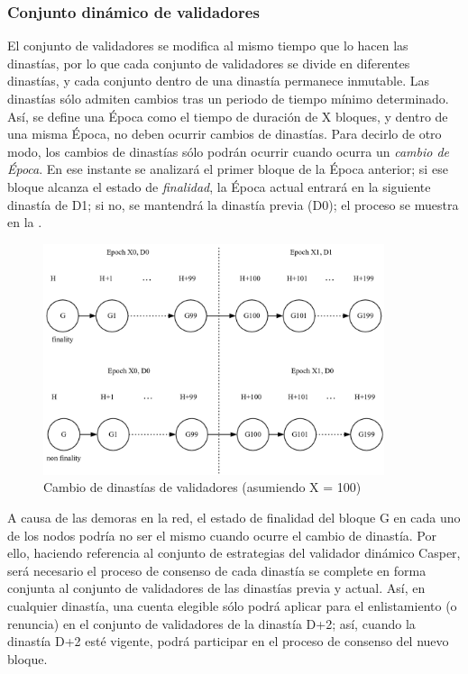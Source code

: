 
\subsubsection{Conjunto dinámico de validadores}
\label{pod:design:validators}

El conjunto de validadores se modifica al mismo tiempo que lo hacen las dinastías, por lo que cada conjunto de validadores se divide en diferentes dinastías, y cada conjunto dentro de una dinastía permanece inmutable. Las dinastías sólo admiten cambios tras un periodo de tiempo mínimo determinado. Así, se define una Época como el tiempo de duración de X bloques, y dentro de una misma Época, no deben ocurrir cambios de dinastías. Para decirlo de otro modo, los cambios de dinastías sólo podrán ocurrir cuando ocurra un \textit{cambio de Época}. En ese instante se analizará el primer bloque de la Época anterior; si ese bloque alcanza el estado de \textit{finalidad}, la Época actual entrará en la siguiente dinastía de D1; si no, se mantendrá la dinastía previa (D0); el proceso se muestra en la .

\begin{figure}[h]
\centering
\includegraphics[width=10cm]{./figs/epoch}
\caption{Cambio de dinastías de validadores (asumiendo X = 100)}
\label{fig:epoch}
\end{figure}

A causa de las demoras en la red, el estado de finalidad del bloque G en cada uno de los nodos podría no ser el mismo cuando ocurre el cambio de dinastía. Por ello, haciendo referencia al conjunto de estrategias del validador dinámico Casper, será necesario el proceso de consenso de cada dinastía se complete en forma conjunta al conjunto de validadores de las dinastías previa y actual. Así, en cualquier dinastía, una cuenta elegible sólo podrá aplicar para el enlistamiento (o renuncia) en el conjunto de validadores de la dinastía D+2; así, cuando la dinastía D+2 esté vigente, podrá participar en el proceso de consenso del nuevo bloque.

